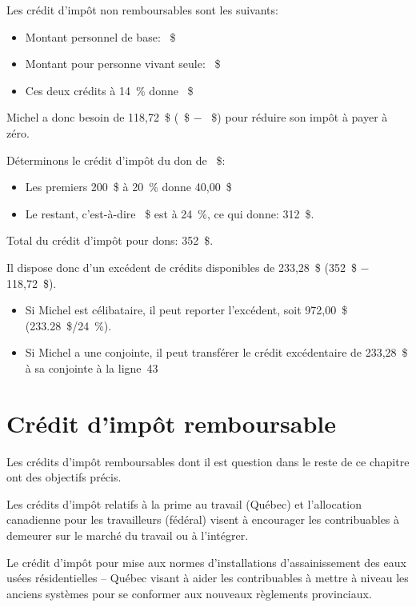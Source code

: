 Les crédit d'impôt non remboursables sont les suivants:
\begin{itemize}
	\item Montant personnel de base: ~\$
	\item Montant pour personne vivant seule: ~\$
	\item Ces deux crédits à 14~\% donne ~\$
\end{itemize}

Michel a donc besoin de 118,72~\$ (~\$ $-$ ~\$) pour réduire son impôt à payer à zéro.

Déterminons le crédit d'impôt du don de ~\$:
\begin{itemize}
	\item Les premiers 200~\$ à 20~\% donne 40,00~\$
	\item Le restant, c'est-à-dire ~\$ est à 24~\%, ce qui donne: 312~\$.
\end{itemize}

Total du crédit d'impôt pour dons: 352~\$.

Il dispose donc d'un excédent de crédits disponibles de 233,28~\$ (352~\$ $-$ 118,72~\$).
\begin{itemize}
	\item Si Michel est célibataire, il peut reporter l'excédent, soit 972,00~\$ (233.28~\$/24~\%).
	\item Si Michel a une conjointe, il peut transférer le crédit excédentaire de 233,28~\$ à sa conjointe à la ligne~43
\end{itemize}



\section{Crédit d'impôt remboursable}
Les crédits d'impôt remboursables dont il est question dans le reste de ce chapitre ont des objectifs précis.

Les crédits d'impôt relatifs à la prime au travail (Québec) et l'allocation canadienne pour les travailleurs (fédéral) visent à encourager les contribuables à demeurer sur le marché du travail ou à l'intégrer.

Le crédit d'impôt pour mise aux normes d'installations d'assainissement des eaux usées résidentielles – Québec visant à aider les contribuables à mettre à niveau les anciens systèmes pour se conformer aux nouveaux règlements provinciaux.



